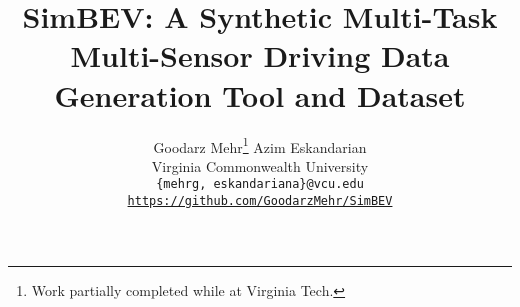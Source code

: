\documentclass[10pt, twocolumn, letterpaper]{article}
\title{SimBEV: A Synthetic Multi-Task Multi-Sensor Driving Data Generation Tool and Dataset}
\author{Goodarz Mehr\thanks{Work partially completed while at Virginia Tech.} \quad Azim Eskandarian\\
Virginia Commonwealth University\\
{\tt\small \{mehrg, eskandariana\}@vcu.edu}\\
{\tt\small\href{https://github.com/GoodarzMehr/SimBEV}{https://github.com/GoodarzMehr/SimBEV}}
}
\begin{document}
    \maketitle
    
        
    
    
    
    
    
    
    
    
    

    {
        \small
        
        
    }
\end{document}
